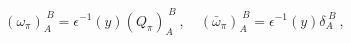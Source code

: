 \begin{equation} \label{omegapi}
	(\omega_{\pi})_A^{\;B}=\epsilon^{-1}(y)(Q_{\pi})_A^{\;B}\ ,\quad(\bar{\omega}_{\pi})_A^{\;B}=\epsilon^{-1}(y)\delta_A^{\;B}\ ,
	\end{equation} 
